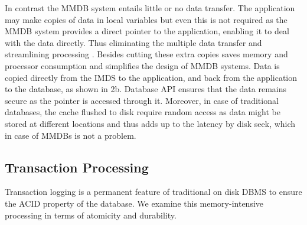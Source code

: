 \documentclass[10pt]{article} %
\begin{document}
In contrast the MMDB system entails little or no data transfer. The application may make copies of data in local variables but even this is not required as the MMDB system provides a direct pointer to the application, enabling it to deal with the data directly. Thus eliminating the multiple data transfer and streamlining processing . Besides cutting these extra copies saves memory and processor consumption and simplifies the design of MMDB systems. Data is copied directly from the IMDS to the application, and back from the application to the database, as shown in \figurename{2b}. Database API ensures that the data remains secure as the pointer is accessed through it. Moreover, in case of traditional databases, the cache flushed to disk require random access as data might be stored at different locations and thus adds up to the latency by disk seek, which in case of MMDBs is not a problem.
 
\subsection{Transaction Processing}
Transaction logging is a permanent feature of traditional on disk DBMS to ensure the ACID property of the database. We examine this memory-intensive processing in terms of atomicity and durability. 
\end{document}
